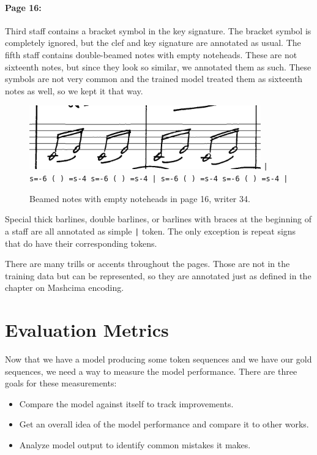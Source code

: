 \paragraph{Page 16:} Third staff contains a bracket symbol in the key signature. The bracket symbol is completely ignored, but the clef and key signature are annotated as usual. The fifth staff contains double-beamed notes with empty noteheads. These are not sixteenth notes, but since they look so similar, we annotated them as such. These symbols are not very common and the trained model treated them as sixteenth notes as well, so we kept it that way.

\begin{figure}[h]
    \centering
    \includegraphics[width=100mm]{../img/ae-16}
    \verb`| s=-6 ( ) =s-4 s=-6 ( ) =s-4 | s=-6 ( ) =s-4 s=-6 ( ) =s-4 |`
    \caption{Beamed notes with empty noteheads in page 16, writer 34.}
    \label{fig6:AnnotationExperience16}
\end{figure}

Special thick barlines, double barlines, or barlines with braces at the beginning of a staff are all annotated as simple \verb`|` token. The only exception is repeat signs that do have their corresponding tokens.

There are many trills or accents throughout the pages. Those are not in the training data but can be represented, so they are annotated just as defined in the chapter on Mashcima encoding.


\section{Evaluation Metrics}

Now that we have a model producing some token sequences and we have our gold sequences, we need a way to measure the model performance. There are three goals for these measurements:

\begin{itemize}
\item Compare the model against itself to track improvements.
\item Get an overall idea of the model performance and compare it to other works.
\item Analyze model output to identify common mistakes it makes.
\end{itemize}

